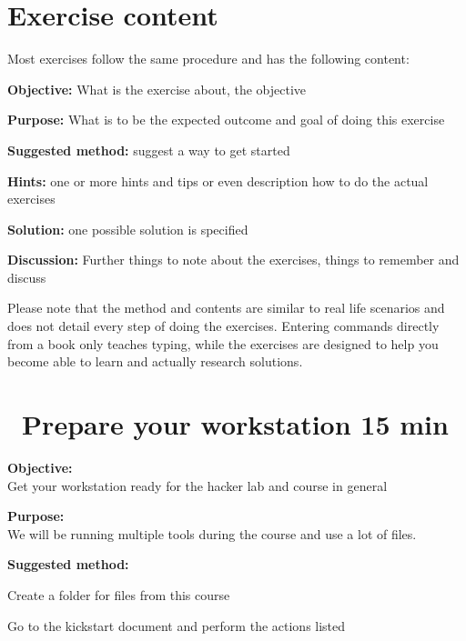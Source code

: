 \documentclass[a4paper,11pt,notitlepage]{report}
\begin{document}

\chapter*{\color{titlecolor}Exercise content}

Most exercises follow the same procedure and has the following content:
\begin{list2}
\item {\bf Objective:} What is the exercise about, the objective
\item {\bf Purpose:} What is to be the expected outcome and goal of doing this exercise
\item {\bf Suggested method:} suggest a way to get started
\item {\bf Hints:} one or more hints and tips or even description how to
do the actual exercises
\item {\bf Solution:} one possible solution is specified
\item {\bf Discussion:} Further things to note about the exercises, things to remember and discuss
\end{list2}

Please note that the method and contents are similar to real life scenarios and does not detail every step of doing the exercises. Entering commands directly from a book only teaches typing, while the exercises are designed to help you become able to learn and actually research solutions.


\chapter{\faExclamationTriangle\ Prepare your workstation 15 min}
\label{ex:prepare-for-course}

{\bf Objective:}\\
Get your workstation ready for the hacker lab and course in general


{\bf Purpose:}\\
We will be running multiple tools during the course and use a lot of files.


{\bf Suggested method:}\\
\begin{list2}
\item Create a folder for files from this course
\item Go to the kickstart document and perform the actions listed
\end{list2}
\end{document}
